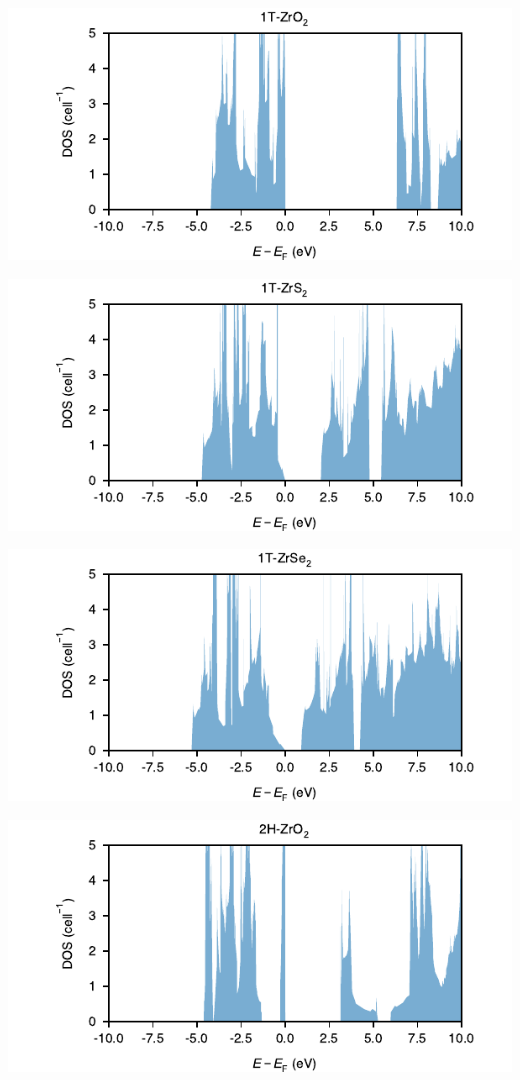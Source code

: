 \begin{center}
\includegraphics[width=.9\linewidth]{img/SI_figs/1T-ZrO2-DOS.pdf}
\end{center}
\begin{center}
\includegraphics[width=.9\linewidth]{img/SI_figs/1T-ZrS2-DOS.pdf}
\end{center}
\begin{center}
\includegraphics[width=.9\linewidth]{img/SI_figs/1T-ZrSe2-DOS.pdf}
\end{center}
\begin{center}
\includegraphics[width=.9\linewidth]{img/SI_figs/2H-ZrO2-DOS.pdf}
\end{center}
